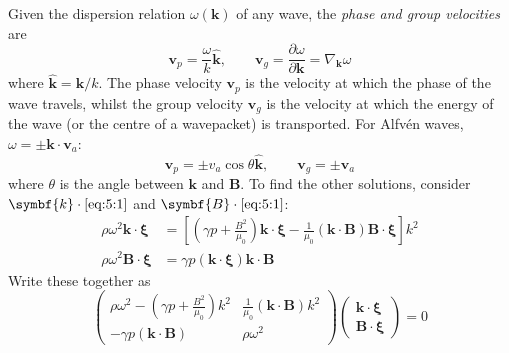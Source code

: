 \documentclass{jknotes}
\newcommand{\B}{\symbf{B}}
\newcommand{\disp}{\symbf{\xi}}
\renewcommand{\v}{\symbf{v}}
\begin{document}
Given the dispersion relation $\omega(\symbf{k})$ of any wave, the \emph{phase
and group velocities} are
\begin{equation}
	\v_p = \frac{\omega}{k}\hat{\symbf{k}}, \hspace{2em} \v_g = \frac{\partial
	\omega}{\partial \symbf{k}} = \nabla_{\symbf{k}} \omega
\end{equation}
where $\hat{\symbf{k}} = \symbf{k}/k$. The phase velocity $\v_p$ is the
velocity at which the phase of the wave travels, whilst the group velocity
$\v_g$ is the velocity at which the energy of the wave (or the centre of a
wavepacket) is transported. For Alfv\'{e}n waves, $\omega = \pm
\symbf{k}\cdot\v_a$:
\begin{equation}
	\v_p = \pm v_a \cos \theta \hat{\symbf{k}}, \hspace{2em} \v_g = \pm \v_a
\end{equation}
where $\theta$ is the angle between $\symbf{k}$ and $\B$. To find the other
solutions, consider $\symbf{k}\cdot\eqref{eq:5:1}$ and $\B \cdot
\eqref{eq:5:1}$:
\begin{align}
	\rho \omega^2 \symbf{k}\cdot\disp &= \left[ \left( \gamma p +
	\frac{B^2}{\mu_0}\right) \symbf{k}\cdot\disp -
	\frac{1}{\mu_0}(\symbf{k}\cdot\B)\B\cdot\disp\right] k^2 \\
	\rho \omega^2 \B \cdot \disp &= \gamma p
	(\symbf{k}\cdot\disp)\symbf{k}\cdot\B
\end{align}
Write these together as
\begin{equation}
	\begin{pmatrix} 
		\rho \omega^2 - \left( \gamma p + \frac{B^2}{\mu_0}\right)k^2 &
		\frac{1}{\mu_0}(\symbf{k}\cdot\B)k^2 \\
	-\gamma p (\symbf{k}\cdot\B) & \rho \omega^2 \end{pmatrix} 
	\begin{pmatrix} \symbf{k}\cdot\disp \\ \B \cdot \disp \end{pmatrix} = 0
\end{equation}
\end{document}
